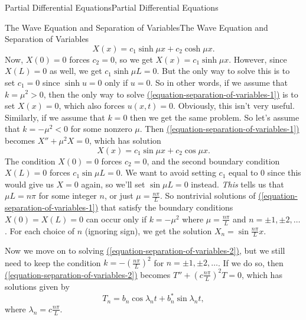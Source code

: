 \documentclass[10pt,]{book}
\numberwithin{equation}{section}
\begin{document}
\begin{chapterptx}{Partial Differential Equations}{}{Partial Differential Equations}{}{}
\begin{sectionptx}{The Wave Equation and Separation of Variables}{}{The Wave Equation and Separation of Variables}{}{}
%
\begin{equation*}
X(x) = c_{1}\sinh\mu x + c_{2}\cosh \mu x.
\end{equation*}
\hypertarget{p-461}{}%
Now, \(X(0)=0\) forces \(c_{2} = 0\), so we get \(X(x) = c_{1}\sinh\mu x\). However, since \(X(L) = 0\) as well, we get \(c_{1}\sinh\mu L = 0\). But the only way to solve this is to set \(c_{1} = 0\) since \(\sinh u = 0\) only if \(u=0\). So in other words, if we assume that \(k = \mu^{2}>0\), then the only way to solve \hyperref[equation-separation-of-variables-1]{(\ref{equation-separation-of-variables-1})} is to set \(X(x) = 0\), which also forces \(u(x,t) = 0\). Obviously, this isn't very useful. Similarly, if we assume that \(k=0\) then we get the same problem. So let's assume that \(k=-\mu^{2}<0\) for some nonzero \(\mu\). Then \hyperref[equation-separation-of-variables-1]{(\ref{equation-separation-of-variables-1})} becomes \(X''+\mu^{2}X = 0\), which has solution%
%
\begin{equation*}
X(x) = c_{1}\sin\mu x + c_{2}\cos \mu x.
\end{equation*}
\hypertarget{p-462}{}%
The condition \(X(0) = 0\) forces \(c_{2} = 0\), and the second boundary condition \(X(L) = 0\) forces \(c_{1}\sin \mu L = 0\). We want to avoid setting \(c_{1}\) equal to \(0\) since this would give us \(X=0\) again, so we'll set \(\sin \mu L= 0\) instead. \emph{This} tells us that \(\mu L = n\pi\) for some integer \(n\), or just \(\mu = \frac{n\pi}{L}\). So nontrivial solutions of \hyperref[equation-separation-of-variables-1]{(\ref{equation-separation-of-variables-1})} that satisfy the boundary conditions \(X(0)=X(L) = 0\) can occur only if \(k = -\mu^{2}\) where \(\mu = \frac{n\pi}{L}\) and \(n=\pm1,\pm2,\ldots\). For each choice of \(n\) (ignoring sign), we get the solution \(X_{n} = \sin\frac{n\pi}{L}x\).%
\par
\hypertarget{p-463}{}%
Now we move on to solving \hyperref[equation-separation-of-variables-2]{(\ref{equation-separation-of-variables-2})}, but we still need to keep the condition \(k=-(\frac{n\pi}{L})^{2}\) for \(n=\pm1,\pm2,\ldots\). If we do so, then \hyperref[equation-separation-of-variables-2]{(\ref{equation-separation-of-variables-2})} becomes \(T''+(c\frac{n\pi}{L})^{2}T=0\), which has solutions given by%
%
\begin{equation*}
T_{n} = b_{n}\cos\lambda_{n}t+b^{*}_{n}\sin\lambda_{n}t,
\end{equation*}
\hypertarget{p-464}{}%
where \(\lambda_{n} = c\frac{n\pi}{L}\).%
\par

\end{sectionptx}
\end{chapterptx}
\end{document}

